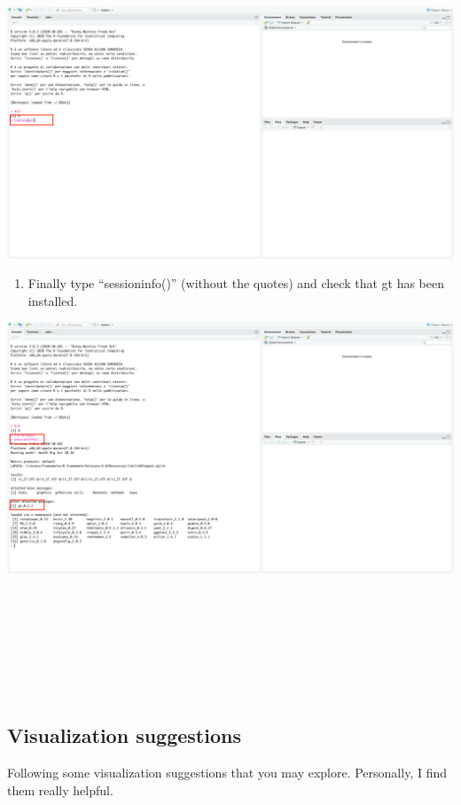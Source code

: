\documentclass[
]{article}
\providecommand{\tightlist}{%
  \setlength{\itemsep}{0pt}\setlength{\parskip}{0pt}}
\begin{document}
\begin{center}\includegraphics[width=0.8\linewidth,]{images/pkg2} \end{center}

\begin{enumerate}
\def\labelenumi{\arabic{enumi}.}
\setcounter{enumi}{8}
\tightlist
\item
  Finally type ``sessioninfo()'' (without the quotes) and check that gt has been installed.\\
\end{enumerate}

\begin{center}\includegraphics[width=0.8\linewidth,]{images/pkg3} \end{center}

~

~

~

~

\hypertarget{visualization-suggestions}{%
\subsection{Visualization suggestions}\label{visualization-suggestions}}

Following some visualization suggestions that you may explore.
Personally, I find them really helpful.
\end{document}
